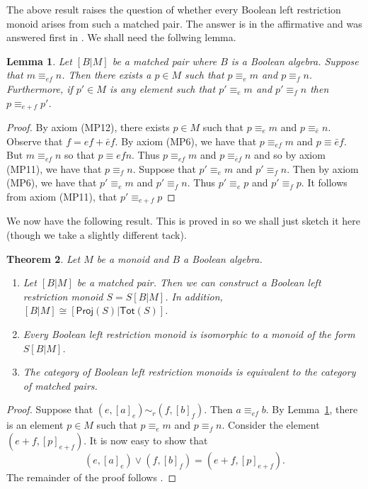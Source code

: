 \documentclass[a4paper]{amsart}
\newtheorem{theorem}{Theorem}[section]
\newtheorem{lemma}[theorem]{Lemma}
\begin{document}
The above result raises the question of whether every Boolean left restriction monoid
arises from such a matched pair. 
The answer is in the affirmative and was answered first in \cite{G2025}.
We shall need the follwing lemma.

\begin{lemma}\label{lem:amelia} Let $[B|M]$ be a matched pair where $B$ is a Boolean algebra.
Suppose that $m \equiv_{ef} n$. Then there exists a $p \in M$ such that
$p \equiv_{e} m$ and $p \equiv_{f} n$.
Furthermore, if $p' \in M$ is any element such that 
$p' \equiv_{e} m$ and $p' \equiv_{f} n$ then
$p \equiv_{e + f} p'$.
\end{lemma}
\begin{proof} By axiom (MP12), there exists $p \in M$ such that $p \equiv_{e} m$ and $p \equiv_{\bar{e}} n$.
Observe that $f = ef + \bar{e}f$.
By axiom (MP6), we have that $p \equiv_{ef} m$ and $p \equiv{\bar{e}f}$.
But $m \equiv_{ef} n$ so that $p \equiv{ef} n$.
Thus $p \equiv_{ef} m$ and $p \equiv_{\bar{e}f} n$ and so by axiom (MP11),
we have that $p \equiv_{f} n$.
Suppose that $p' \equiv_{e} m$ and $p' \equiv_{f} n$.
Then by axiom (MP6), we have that $p' \equiv_{e} m$ and $p' \equiv_{f} n$.
Thus $p' \equiv_{e} p$ and $p' \equiv_{f} p$.
It follows from axiom (MP11),  that $p' \equiv_{e + f} p$ 
\end{proof}


We now have the following result.
This is proved in \cite{G2025} so we shall just sketch it here (though we take a slightly different tack).


\begin{theorem} Let $M$ be a monoid and $B$ a Boolean algebra. 
\begin{enumerate} 

\item Let $[B|M]$ be a matched pair. Then we can construct a Boolean left restriction monoid $S = S[B|M]$.
In addition, $[B|M] \cong [\mathsf{Proj}(S)|\mathsf{Tot}(S)]$.

\item Every Boolean left restriction monoid is isomorphic to a monoid of the form  $S[B|M]$.

\item The category of Boolean left restriction monoids is equivalent to the category of matched pairs. 

\end{enumerate}
\end{theorem}
\begin{proof} Suppose that $(e,[a]_{e}) \sim_{r} (f,[b]_{f})$.
Then $a \equiv_{ef} b$.
By Lemma~\ref{lem:amelia}, there is an element $p \in M$ such that $p \equiv_{e} m$ and $p \equiv_{f} n$.
Consider the element $(e+f, [p]_{e+f})$.
It is now easy to show that
$$(e,[a]_{e}) \vee (f,[b]_{f}) = (e+f, [p]_{e+f}).$$
The remainder of the proof follows
\cite[Proposition 3.4, Theorem 3.5]{G2025}.
\end{proof}
\end{document}
